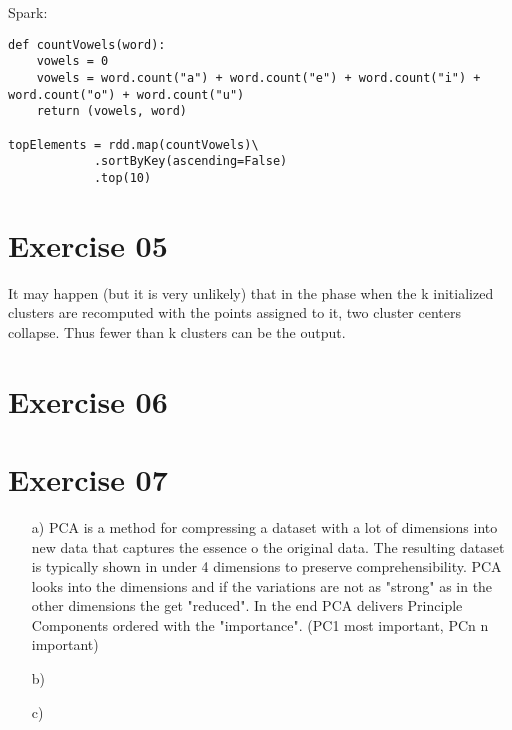 \documentclass[11pt,a4paper]{scrartcl}
\begin{document}
Spark:
\begin{lstlisting}
def countVowels(word):
	vowels = 0
	vowels = word.count("a") + word.count("e") + word.count("i") + word.count("o") + word.count("u")
	return (vowels, word)
	
topElements = rdd.map(countVowels)\
			.sortByKey(ascending=False)
			.top(10)
\end{lstlisting}

\section*{Exercise 05}
It may happen (but it is very unlikely) that in the phase when the k initialized clusters are recomputed with the points assigned to it, two cluster centers collapse. Thus fewer than k clusters can be the output.

\section*{Exercise 06}


\section*{Exercise 07}
\begin{itemize}
	\item[a)] PCA is a method for compressing a dataset with a lot of dimensions into new data that captures the essence o the original data. The resulting dataset is typically shown in under 4 dimensions to preserve comprehensibility. PCA looks into the dimensions and if the variations are not as "strong" as in the other dimensions the get "reduced". In the end PCA delivers Principle Components ordered with the "importance". (PC1 most important, PCn n important)
	\item[b)] 
	\item[c)]
\end{itemize}
\end{document}
